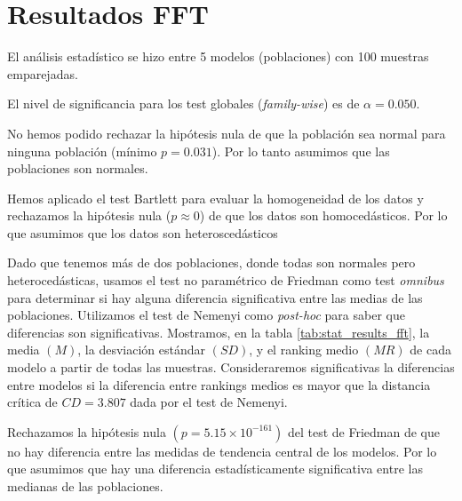 \documentclass[a4paper,oneside,11pt,leqno]{article}
\begin{document}
	\section{Resultados FFT}
	\label{sec:results_fft}
	
	El análisis estadístico se hizo entre 5 modelos (poblaciones) con 100 muestras emparejadas.
	
	El nivel de significancia para los test globales (\textit{family-wise}) es de $\alpha=0.050$.
	
	No hemos podido rechazar la hipótesis nula de que la población sea normal para ninguna población (mínimo $p=0.031$). Por lo tanto asumimos que las poblaciones son normales.
	
	Hemos aplicado el test Bartlett para evaluar la homogeneidad de los datos y rechazamos la hipótesis nula ($p\approx 0$) de que los datos son homocedásticos. Por lo que asumimos que los datos son heteroscedásticos
	
	Dado que tenemos más de dos poblaciones, donde todas son normales pero heterocedásticas, usamos el test no paramétrico de Friedman como test \textit{omnibus} para determinar si hay alguna diferencia significativa entre las medias de las poblaciones. Utilizamos el test de Nemenyi como \textit{post-hoc} para saber que diferencias son significativas. Mostramos, en la tabla \ref{tab:stat_results_fft}, la media $(M)$, la desviación estándar $(SD)$, y el ranking medio $(MR)$ de cada modelo a partir de todas las muestras. Consideraremos significativas la diferencias entre modelos si la diferencia entre rankings medios es mayor que la distancia crítica de $CD=3.807$ dada por el test de Nemenyi.
	
	Rechazamos la hipótesis nula $(p=5.15\times 10^{-161})$ del test de Friedman de que no hay diferencia entre las medidas de tendencia central de los modelos. Por lo que asumimos que hay una diferencia estadísticamente significativa entre las medianas de las poblaciones.
	
\end{document}
